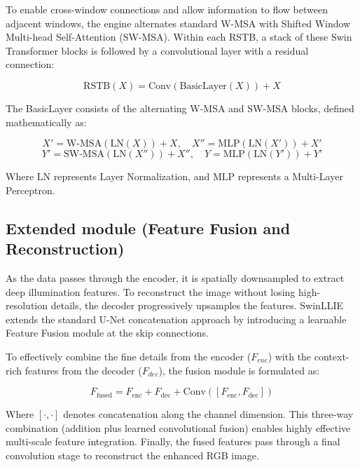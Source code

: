 \documentclass[12pt, a4paper]{report}
\begin{document}
To enable cross-window connections and allow information to flow between adjacent windows, the engine alternates standard W-MSA with Shifted Window Multi-head Self-Attention (SW-MSA). Within each RSTB, a stack of these Swin Transformer blocks is followed by a convolutional layer with a residual connection:

\begin{equation}
\text{RSTB}(X) = \text{Conv}(\text{BasicLayer}(X)) + X
\end{equation}

The BasicLayer consists of the alternating W-MSA and SW-MSA blocks, defined mathematically as:

\begin{equation}
X' = \text{W-MSA}(\text{LN}(X)) + X, \quad X'' = \text{MLP}(\text{LN}(X')) + X'
\end{equation}
\begin{equation}
Y' = \text{SW-MSA}(\text{LN}(X'')) + X'', \quad Y = \text{MLP}(\text{LN}(Y')) + Y'
\end{equation}

Where $\text{LN}$ represents Layer Normalization, and $\text{MLP}$ represents a Multi-Layer Perceptron.

\subsection{Extended module (Feature Fusion and Reconstruction)}
As the data passes through the encoder, it is spatially downsampled to extract deep illumination features. To reconstruct the image without losing high-resolution details, the decoder progressively upsamples the features. SwinLLIE extends the standard U-Net concatenation approach by introducing a learnable Feature Fusion module at the skip connections.

To effectively combine the fine details from the encoder ($F_{enc}$) with the context-rich features from the decoder ($F_{dec}$), the fusion module is formulated as:

\begin{equation}
F_{\text{fused}} = F_{\text{enc}} + F_{\text{dec}} + \text{Conv}([F_{\text{enc}}, F_{\text{dec}}])
\end{equation}

Where $[\cdot, \cdot]$ denotes concatenation along the channel dimension. This three-way combination (addition plus learned convolutional fusion) enables highly effective multi-scale feature integration. Finally, the fused features pass through a final convolution stage to reconstruct the enhanced RGB image.
\end{document}
